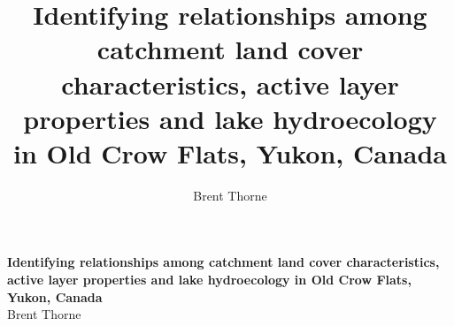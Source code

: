 \documentclass[article,30pt,extrafontsizes]{memoir}
\author{Brent Thorne}
\title{Identifying relationships among catchment land cover characteristics,
active layer properties and lake hydroecology in Old Crow Flats, Yukon,
Canada}
\begin{document}
\begin{mdframed}[backgroundcolor=myframecolour,linecolor=Red,topline=false,leftline=false,rightline=false,linewidth=2mm]

\begingroup
  \centering
  \color{White}
  \huge\textbf{Identifying relationships among catchment land cover characteristics,
active layer properties and lake hydroecology in Old Crow Flats, Yukon,
Canada}\\[0.3in]
  \Large Brent Thorne \par
\vspace{1.2in}
  \endgroup
\end{mdframed}
\end{document}
